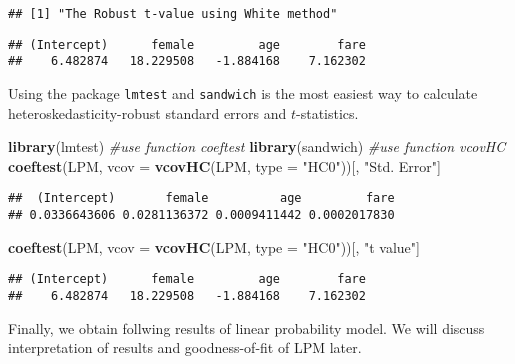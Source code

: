 \documentclass[
  12pt,
]{article}
\newenvironment{Shaded}{\begin{snugshade}}{\end{snugshade}}
\newcommand{\CommentTok}[1]{\textcolor[rgb]{0.56,0.35,0.01}{\textit{#1}}}
\newcommand{\DataTypeTok}[1]{\textcolor[rgb]{0.13,0.29,0.53}{#1}}
\newcommand{\KeywordTok}[1]{\textcolor[rgb]{0.13,0.29,0.53}{\textbf{#1}}}
\newcommand{\NormalTok}[1]{#1}
\newcommand{\StringTok}[1]{\textcolor[rgb]{0.31,0.60,0.02}{#1}}
\begin{document}
\begin{verbatim}
## [1] "The Robust t-value using White method"
\end{verbatim}

\begin{verbatim}
## (Intercept)      female         age        fare 
##    6.482874   18.229508   -1.884168    7.162302
\end{verbatim}

Using the package \texttt{lmtest} and \texttt{sandwich} is the most
easiest way to calculate heteroskedasticity-robust standard errors and
\(t\)-statistics.

\begin{Shaded}
\begin{Highlighting}[]
\KeywordTok{library}\NormalTok{(lmtest) }\CommentTok{\#use function \textasciigrave{}coeftest\textasciigrave{}}
\KeywordTok{library}\NormalTok{(sandwich) }\CommentTok{\#use function \textasciigrave{}vcovHC\textasciigrave{}}
\KeywordTok{coeftest}\NormalTok{(LPM, }\DataTypeTok{vcov =} \KeywordTok{vcovHC}\NormalTok{(LPM, }\DataTypeTok{type =} \StringTok{"HC0"}\NormalTok{))[, }\StringTok{"Std. Error"}\NormalTok{]}
\end{Highlighting}
\end{Shaded}

\begin{verbatim}
##  (Intercept)       female          age         fare 
## 0.0336643606 0.0281136372 0.0009411442 0.0002017830
\end{verbatim}

\begin{Shaded}
\begin{Highlighting}[]
\KeywordTok{coeftest}\NormalTok{(LPM, }\DataTypeTok{vcov =} \KeywordTok{vcovHC}\NormalTok{(LPM, }\DataTypeTok{type =} \StringTok{"HC0"}\NormalTok{))[, }\StringTok{"t value"}\NormalTok{]}
\end{Highlighting}
\end{Shaded}

\begin{verbatim}
## (Intercept)      female         age        fare 
##    6.482874   18.229508   -1.884168    7.162302
\end{verbatim}

Finally, we obtain follwing results of linear probability model. We will
discuss interpretation of results and goodness-of-fit of LPM later.
\end{document}
